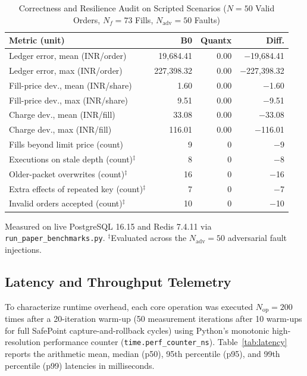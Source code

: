 \documentclass[journal,onecolumn,10pt]{IEEEtran}
\begin{document}
\begin{table}[!t]
\caption{Correctness and Resilience Audit on Scripted Scenarios ($N=50$ Valid Orders, $N_f=73$ Fills, $N_{\mathrm{adv}}=50$ Faults)}
\label{tab:correct}
\centering
\small
\renewcommand{\arraystretch}{1.12}
\begin{tabularx}{\textwidth}{@{}>{\raggedright\arraybackslash}X r r r@{}}
\toprule
Metric (unit) & B0 & Quantx & Diff. \\
\midrule
Ledger error, mean (INR/order) & 19,684.41 & 0.00 & $-$19,684.41 \\
Ledger error, max (INR/order) & 227,398.32 & 0.00 & $-$227,398.32 \\
Fill-price dev., mean (INR/share) & 1.60 & 0.00 & $-$1.60 \\
Fill-price dev., max (INR/share) & 9.51 & 0.00 & $-$9.51 \\
Charge dev., mean (INR/fill) & 33.08 & 0.00 & $-$33.08 \\
Charge dev., max (INR/fill) & 116.01 & 0.00 & $-$116.01 \\
Fills beyond limit price (count) & 9 & 0 & $-$9 \\
Executions on stale depth (count)$^{\ddagger}$ & 8 & 0 & $-$8 \\
Older-packet overwrites (count)$^{\ddagger}$ & 16 & 0 & $-$16 \\
Extra effects of repeated key (count)$^{\ddagger}$ & 7 & 0 & $-$7 \\
Invalid orders accepted (count)$^{\ddagger}$ & 10 & 0 & $-$10 \\
\bottomrule
\end{tabularx}

\vspace{2pt}
{\footnotesize Measured on live PostgreSQL 16.15 and Redis 7.4.11 via \texttt{run\_paper\_benchmarks.py}. $^{\ddagger}$Evaluated across the $N_{\mathrm{adv}}=50$ adversarial fault injections.}
\end{table}

\subsection{Latency and Throughput Telemetry}
To characterize runtime overhead, each core operation was executed $N_{\mathrm{op}}=200$ times after a 20-iteration warm-up (50 measurement iterations after 10 warm-ups for full SafePoint capture-and-rollback cycles) using Python's monotonic high-resolution performance counter (\texttt{time.perf\_counter\_ns}). Table~\ref{tab:latency} reports the arithmetic mean, median (p50), 95th percentile (p95), and 99th percentile (p99) latencies in milliseconds.
\end{document}
